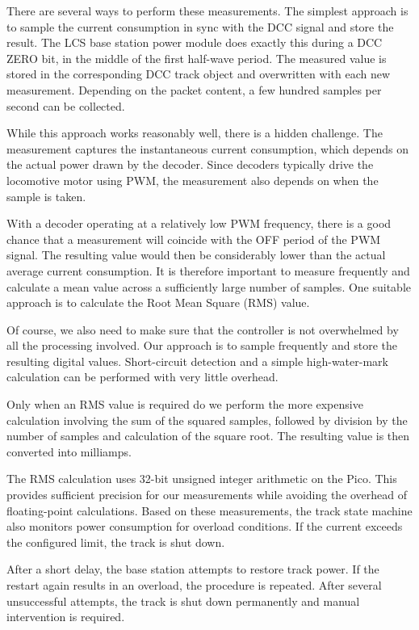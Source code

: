 There are several ways to perform these measurements. The simplest approach is to sample the current consumption in sync with the DCC signal and store the result. The LCS base station power module does exactly this during a DCC ZERO bit, in the middle of the first half-wave period. The measured value is stored in the corresponding DCC track object and overwritten with each new measurement. Depending on the packet content, a few hundred samples per second can be collected.

While this approach works reasonably well, there is a hidden challenge. The measurement captures the instantaneous current consumption, which depends on the actual power drawn by the decoder. Since decoders typically drive the locomotive motor using PWM, the measurement also depends on when the sample is taken.

With a decoder operating at a relatively low PWM frequency, there is a good chance that a measurement will coincide with the OFF period of the PWM signal. The resulting value would then be considerably lower than the actual average current consumption.
It is therefore important to measure frequently and calculate a mean value across a sufficiently large number of samples. One suitable approach is to calculate the Root Mean Square (RMS) value.

Of course, we also need to make sure that the controller is not overwhelmed by all the processing involved. Our approach is to sample frequently and store the resulting digital values. Short-circuit detection and a simple high-water-mark calculation can be performed with very little overhead.

Only when an RMS value is required do we perform the more expensive calculation involving the sum of the squared samples, followed by division by the number of samples and calculation of the square root. The resulting value is then converted into milliamps.

The RMS calculation uses 32-bit unsigned integer arithmetic on the Pico. This provides sufficient precision for our measurements while avoiding the overhead of floating-point calculations.
Based on these measurements, the track state machine also monitors power consumption for overload conditions. If the current exceeds the configured limit, the track is shut down.

After a short delay, the base station attempts to restore track power. If the restart again results in an overload, the procedure is repeated. After several unsuccessful attempts, the track is shut down permanently and manual intervention is required.

